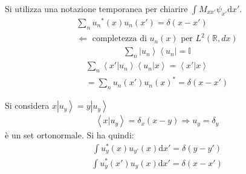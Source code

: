 Si utilizza una notazione temporanea per chiarire $\int{M_{xx'}\psi _{x'}\textrm{d}x'}$.
\begin{equation}\begin{split}
\sum_n{u_n}^*\left(x\right)u_n\left(x'\right)=\delta\left(x-x'\right) \\
\Longleftarrow \textrm{ completezza di } u_n\left(x\right) \textrm{ per } L^2\left(\mathbb{R} ,dx\right)
\end{split}\end{equation}
\begin{equation}\begin{split}
\sum_n{\left |u_n \right\rangle\left\langle u_n\right |}=\mathbb{I}
\end{split}\end{equation}
\begin{equation}\begin{split}
\sum_n{\left\langle x'|u_n \right\rangle\left\langle u_n|x \right\rangle}=\left\langle x'|x \right\rangle \\
=\sum_n{u_n\left(x'\right)u_n\left(x\right)^*}=\delta\left(x-x'\right)
\end{split}\end{equation}

Si considera $x\left |u_y \right\rangle=y\left |u_y \right\rangle$
\begin{equation}\begin{split}
\left\langle x|u_y \right\rangle=\delta_x\left(x-y\right) \Longrightarrow u_y=\delta_y
\end{split}\end{equation}
è un set ortonormale. Si ha quindi:
\begin{equation}\begin{split}
\int{u^*_y\left(x\right)u_{y'}\left(x\right)\textrm{d}x'}=\delta\left(y-y'\right)
\end{split}\end{equation}
\begin{equation}\begin{split}
\int{u^*_y\left(x'\right)u_{y}\left(x\right)\textrm{d}x'}=\delta\left(x-x'\right)
\end{split}\end{equation}


